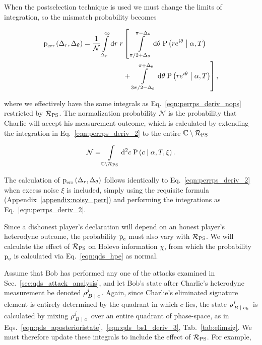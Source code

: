 \noindent When the postselection technique is used we must change the limits of integration, so the mismatch probability becomes

\begin{align}\label{eqn:perrps_deriv_2}
\perr\left(\Delta_r, \Delta_\theta\right) %
= \frac{1}{\mathcal{N}} \int\limits_{\Delta_r}^{\infty} \mathrm{d}r \; r &\left[ \; \int\limits_{ \pi/2 + \Delta_\theta}^{\pi - \Delta_\theta} \mathrm{d}\theta \; \text{P}\left(r e^{i \theta} \given \alpha, T\right) \right. \notag \\
%
 &+ \left. \int\limits_{3 \pi/2 - \Delta_\theta}^{\pi + \Delta_\theta} \mathrm{d}\theta \; \text{P}\left(r e^{i \theta} \given \alpha, T\right) \right],
\end{align}


\noindent where we effectively have the same integrals as Eq.~\ref{eqn:perrps_deriv_nops} restricted by $\mathcal{R}_{\text{PS}}$. The normalization probability $\mathcal{N}$ is the probability that Charlie will accept his measurement outcome, which is calculated by extending the integration in Eq.~\ref{eqn:perrps_deriv_2} to the entire $\mathbb{C} \setminus \mathcal{R}_{\text{PS}}$

\begin{equation}\label{eqn:qds_perrps_normalization}
\mathcal{N} = \int\limits_{\mathbb{C} \setminus \mathcal{R}_{\text{PS}}} \mathop{}\!\mathrm{d^2} c \; \text{P}\left(c \; \middle| \; \alpha, T, \xi \right).
\end{equation}

\noindent The calculation of $\text{p}_{\text{err}}\left(\Delta_r, \Delta_\theta\right)$ follows identically to Eq.~\ref{eqn:perrps_deriv_2} when excess noise $\xi$ is included, simply using the requisite formula (Appendix~\ref{appendix:noisy_perr}) and performing the integrations as Eq.~\ref{eqn:perrps_deriv_2}.


Since a dishonest player's declaration will depend on an honest player's heterodyne outcome, the probability $\text{p}_{\text{e}}$ must also vary with $\mathcal{R}_{\text{PS}}$. We will calculate the effect of $\mathcal{R}_{\text{PS}}$ on Holevo information $\chi$, from which the probability $\text{p}_{\text{e}}$ is calculated via Eq.~\ref{eqn:qds_hpe} as normal.

Assume that Bob has performed any one of the attacks examined in Sec.~\ref{sec:qds_attack_analysis}, and let Bob's state after Charlie's heterodyne measurement be denoted $\rho_{\left. B \; \middle| \; c\right.}^j$. Again, since Charlie's eliminated signature element is entirely determined by the quadrant in which $c$ lies, the state $\rho_{\left. B \; \middle| \;  e_k\right.}^j$ is calculated by mixing $\rho_{\left.B \; \middle| \; c\right.}^j$ over an entire quadrant of phase-space, as in Eqs.~\ref{eqn:qds_aposterioristate},~\ref{eqn:qds_bs1_deriv_3}, Tab.~\ref{tab:elimsig}. We must therefore update these integrals to include the effect of $\mathcal{R}_{\text{PS}}$. For example,

